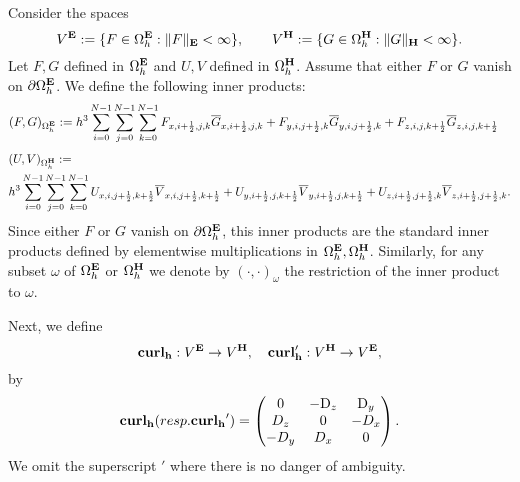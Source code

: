 \documentclass[12pt,reqno]{amsart}
\newcommand{\D}{{\rm D}}
\newcommand{\curl}{{\bf curl}}
\newcommand{\e}{{\bf E}}
\newcommand{\h}{{\bf H}}
\theoremstyle{definition}
\numberwithin{equation}{section}
\def\Gwh{\Omega_h}
\begin{document}
		Consider  the spaces 
		$$
		V^{\bf{E}}:=\{F \in \Gwh^{\bf{E}}:\|F\|_{\bf{E}}<\infty\}, \qquad 
		V^{\bf{H}}:=\{G \in \Gwh^{\bf{H}}:\|G\|_{\bf{H}}<\infty\}.
		$$
		Let $F,G$ defined in $\Gwh^{\bf{E}}$ and $U,V$ defined in 
		$\Gwh^{\bf{H}}$. Assume that either $F$ or $G$ vanish on $\partial \Gwh^\e$.
		We define the following inner products:
		\begin{align*}
&
		(F,G)_{\Gwh^\e}:=
		h^3\sum_{i=0}^{N-1}\sum_{j=0}^{N-1}\sum_{k=0}^{N-1}
		F_{x,i+\frac{1}{2},j,k}\overline{G}_{x,i+\frac{1}{2},j,k}+
		F_{y,i,j+\frac{1}{2},k}\overline{G}_{y,i,j+\frac{1}{2},k}+F_{z,i,j,k+\frac{1}{2}}\overline{G}_{z,i,j,k+\frac{1}{2}}
	\end{align*}
		\begin{align*}
			&
			(U,V)_{\Gwh^\h}:=\\&
			h^3\sum_{i=0}^{N-1}\sum_{j=0}^{N-1}\sum_{k=0}^{N-1}
			U_{x,i,j+\frac{1}{2},k+\frac{1}{2}}\overline{V}_{x,i,j+\frac{1}{2},k+\frac{1}{2}}+
			U_{y,i+\frac{1}{2},j,k+\frac{1}{2}}\overline{V}_{y,i+\frac{1}{2},j,k+\frac{1}{2}}+U_{z,i+\frac{1}{2},j+\frac{1}{2},k}\overline{V}_{z,i+\frac{1}{2},j+\frac{1}{2},k}.
		\end{align*}
		Since either $F$ or $G$ vanish on $\partial \Gwh^\e$, this inner products are the standard inner products defined by elementwise  multiplications in $\Gwh^\e, \Gwh^\h$.
		Similarly, for any subset $\omega$ of $\Gwh^\e$ or $\Gwh^\h$ we denote by $(\cdot,\cdot)_{\omega}$ the restriction of the  inner product to $\omega$.
		
		
		
		Next, we define 
		$$
		\mathbf{\curl_h}:V^{\bf{E}}\to V^{\bf{H}}, \quad 
		\mathbf{\curl_h'}:V^{\bf{H}}\to V^{\bf{E}},
		$$
		by
		$$
		\mathbf{\curl_h}( resp. \mathbf{\curl_h}')=
		\begin{pmatrix}
			0& -\D_z & \D _y\\
			D_z&0&-D_x\\
			-D_y&D_x&0\\
		\end{pmatrix}.
		$$
		We omit the superscript $'$ where there is no danger of ambiguity.
		
\end{document}
